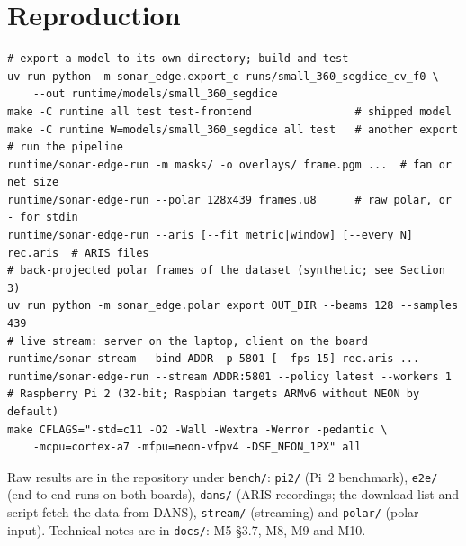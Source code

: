 \documentclass[11pt,a4paper]{article}
\begin{document}
\appendix
\section{Reproduction}

\begin{small}
\begin{verbatim}
# export a model to its own directory; build and test
uv run python -m sonar_edge.export_c runs/small_360_segdice_cv_f0 \
    --out runtime/models/small_360_segdice
make -C runtime all test test-frontend                # shipped model
make -C runtime W=models/small_360_segdice all test   # another export
# run the pipeline
runtime/sonar-edge-run -m masks/ -o overlays/ frame.pgm ...  # fan or net size
runtime/sonar-edge-run --polar 128x439 frames.u8      # raw polar, or - for stdin
runtime/sonar-edge-run --aris [--fit metric|window] [--every N] rec.aris  # ARIS files
# back-projected polar frames of the dataset (synthetic; see Section 3)
uv run python -m sonar_edge.polar export OUT_DIR --beams 128 --samples 439
# live stream: server on the laptop, client on the board
runtime/sonar-stream --bind ADDR -p 5801 [--fps 15] rec.aris ...
runtime/sonar-edge-run --stream ADDR:5801 --policy latest --workers 1
# Raspberry Pi 2 (32-bit; Raspbian targets ARMv6 without NEON by default)
make CFLAGS="-std=c11 -O2 -Wall -Wextra -Werror -pedantic \
    -mcpu=cortex-a7 -mfpu=neon-vfpv4 -DSE_NEON_1PX" all
\end{verbatim}
\end{small}
Raw results are in the repository under \texttt{bench/}: \texttt{pi2/}
(Pi~2 benchmark), \texttt{e2e/} (end-to-end runs on both boards),
\texttt{dans/} (ARIS recordings; the download list and script fetch the
data from DANS), \texttt{stream/} (streaming) and \texttt{polar/} (polar
input). Technical notes are in \texttt{docs/}: M5 §3.7, M8, M9 and M10.
\end{document}
